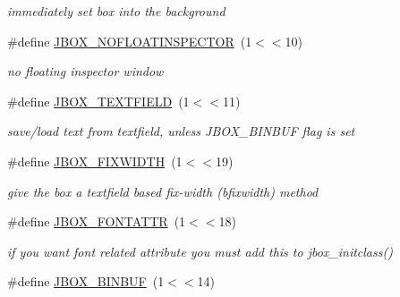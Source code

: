 \begin{DoxyCompactItemize}
\begin{DoxyCompactList}\small\item\em immediately set box into the background \item\end{DoxyCompactList}\item 
\hypertarget{group__jbox_gafc1b0cebedef206c073622cab8fc6785}{
\#define \hyperlink{group__jbox_gafc1b0cebedef206c073622cab8fc6785}{JBOX\_\-NOFLOATINSPECTOR}~(1$<$$<$10)}
\label{group__jbox_gafc1b0cebedef206c073622cab8fc6785}

\begin{DoxyCompactList}\small\item\em no floating inspector window \item\end{DoxyCompactList}\item 
\hypertarget{group__jbox_ga1abed197d8348eb15df1a5c9d4bc368d}{
\#define \hyperlink{group__jbox_ga1abed197d8348eb15df1a5c9d4bc368d}{JBOX\_\-TEXTFIELD}~(1$<$$<$11)}
\label{group__jbox_ga1abed197d8348eb15df1a5c9d4bc368d}

\begin{DoxyCompactList}\small\item\em save/load text from textfield, unless JBOX\_\-BINBUF flag is set \item\end{DoxyCompactList}\item 
\hypertarget{group__jbox_gafb46881fa4dbaf5073e1ee6929d7fa9d}{
\#define \hyperlink{group__jbox_gafb46881fa4dbaf5073e1ee6929d7fa9d}{JBOX\_\-FIXWIDTH}~(1$<$$<$19)}
\label{group__jbox_gafb46881fa4dbaf5073e1ee6929d7fa9d}

\begin{DoxyCompactList}\small\item\em give the box a textfield based fix-\/width (bfixwidth) method \item\end{DoxyCompactList}\item 
\hypertarget{group__jbox_ga04c45cfbc143d2efaeac28f40cee0459}{
\#define \hyperlink{group__jbox_ga04c45cfbc143d2efaeac28f40cee0459}{JBOX\_\-FONTATTR}~(1$<$$<$18)}
\label{group__jbox_ga04c45cfbc143d2efaeac28f40cee0459}

\begin{DoxyCompactList}\small\item\em if you want font related attribute you must add this to jbox\_\-initclass() \item\end{DoxyCompactList}\item 
\hypertarget{group__jbox_gad7eebf09211fa7da46d6d3bcc7da7f41}{
\#define \hyperlink{group__jbox_gad7eebf09211fa7da46d6d3bcc7da7f41}{JBOX\_\-BINBUF}~(1$<$$<$14)}
\label{group__jbox_gad7eebf09211fa7da46d6d3bcc7da7f41}


\end{DoxyCompactItemize}
